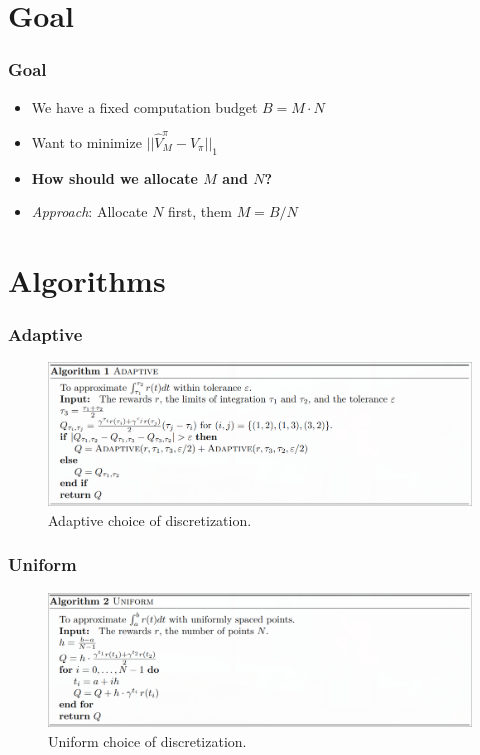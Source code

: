 \documentclass{beamer}
\begin{document}
\section*{Goal}

\begin{frame}
  \frametitle{Goal}
  \begin{itemize}
    \item We have a fixed computation budget $B = M\cdot N$
    \item Want to minimize $\lvert\lvert \hat{V}^\pi_M - V_\pi \rvert\rvert_1$
    \vfill
    \item \textbf{How should we allocate $M$ and $N$?}
    \vfill
    \item \emph{Approach}: Allocate $N$ first, them $M = B/N$
  \end{itemize} 
\end{frame}

\section*{Algorithms}

\begin{frame}
	\frametitle{Adaptive}
  \begin{figure}[ht]
    \centering
    \includegraphics[width=\textwidth]{./imgs/adaptive.png} %
    \caption{Adaptive choice of discretization.}
  \end{figure}
\end{frame}

\begin{frame}
	\frametitle{Uniform}
  \begin{figure}[ht]
    \centering
    \includegraphics[width=\textwidth]{./imgs/uniform.png} %
    \caption{Uniform choice of discretization.}
  \end{figure}
\end{frame}
\end{document}
